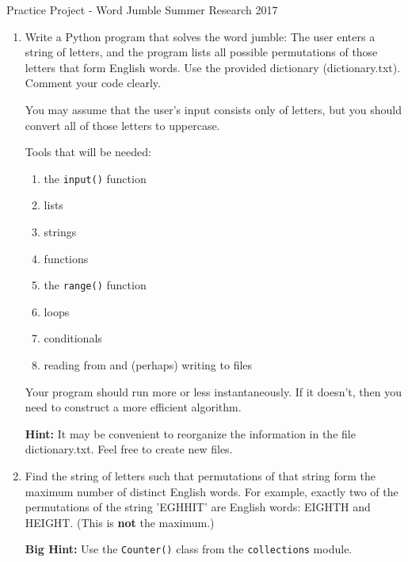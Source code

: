 \documentclass[12pt]{article}
\theoremstyle{plain}
\theoremstyle{definition}
\begin{document}
\begin{center}
{\large Practice Project - Word Jumble} \linebreak Summer Research 2017
\end{center}

\begin{enumerate}

\item Write a Python program that solves the word jumble: The user enters a string of letters, and the program lists all possible permutations of those letters that form English words.  Use the provided dictionary (dictionary.txt).  Comment your code clearly.    

You may assume that the user's input consists only of letters, but you should convert all of those letters to uppercase.

Tools that will be needed:
\begin{enumerate}
	\item the \verb+input()+ function
	\item lists
	\item strings
	\item functions
	\item the \verb+range()+ function
	\item loops
	\item conditionals
	\item reading from and (perhaps) writing to files
\end{enumerate}

Your program should run more or less instantaneously.  If it doesn't, then you need to construct a more efficient algorithm.  

\textbf{Hint:}  It may be convenient to reorganize the information in the file dictionary.txt.  Feel free to create new files.

\item Find the string of letters such that permutations of that string form the maximum number of distinct English words.  For example, exactly two of the permutations of the string 'EGHHIT' are English words: EIGHTH and HEIGHT.  (This is \textbf{not} the maximum.) 

\textbf{Big Hint:}  Use the \verb+Counter()+ class from the \verb+collections+ module.


\end{enumerate}
\end{document}
